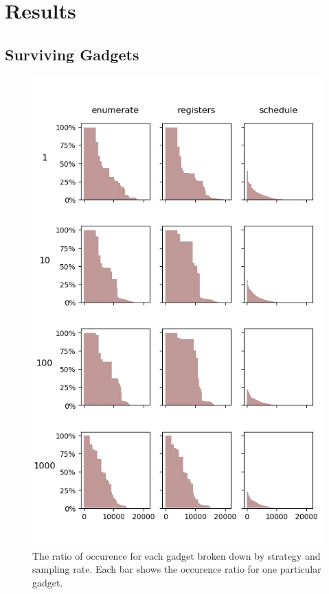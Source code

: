 \chapter{Results}

\section{Surviving Gadgets}

\begin{figure}[htp]
	\centering
	\includegraphics[width=\textwidth,height=\textheight]{results/figures/gadgets}
	\caption{The ratio of occurence for each gadget broken down by strategy and sampling rate.
Each bar shows the occurence ratio for one particular gadget.}
	\label{fig:gadgets}
\end{figure}

